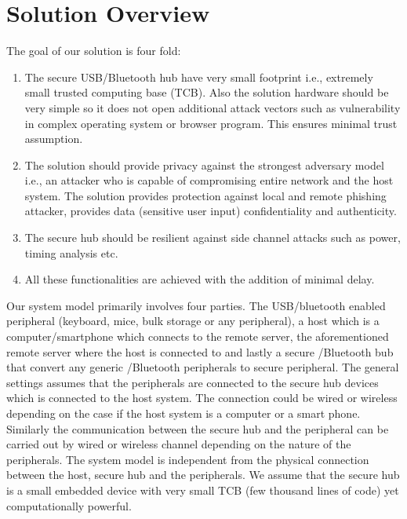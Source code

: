 \section{Solution Overview}
\label{sec:solutionoverview}


The goal of our solution is four fold:
\begin{enumerate}
  \item The secure USB/Bluetooth hub have very small footprint i.e., extremely   small trusted computing base (TCB). Also the solution hardware should be very simple so it does not open additional attack vectors such as vulnerability in complex operating system or browser program. This ensures minimal trust assumption.
  
  \item The solution should provide privacy against the strongest adversary model i.e., an attacker who is capable of compromising entire network and the host system. The solution provides protection against local and remote phishing attacker, provides data (sensitive user input) confidentiality and authenticity.
 
  \item The secure hub should be resilient against side channel attacks such as power, timing analysis etc. 
  
  \item All these functionalities are achieved with the addition of minimal delay.

\end{enumerate}

Our system model primarily involves four parties. The USB/bluetooth enabled peripheral (keyboard, mice, bulk storage or any peripheral), a host which is a computer/smartphone which connects to the remote server, the aforementioned remote server where the host is connected to and lastly a secure \usb/Bluetooth bub that convert any generic \usb/Bluetooth peripherals to secure peripheral. The general settings assumes that the peripherals are connected to the secure hub devices which is connected to the host system. The connection could be wired or wireless depending on the case if the host system is a computer or a smart phone. Similarly the communication between the secure hub and the peripheral can be carried out by wired or wireless channel depending on the nature of the peripherals. The system model is independent from the physical connection between the host, secure hub and the peripherals. We assume that the secure hub is a small embedded device with very small TCB (few thousand lines of code) yet computationally powerful.




